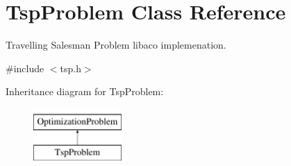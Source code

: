 \hypertarget{classTspProblem}{\section{Tsp\-Problem Class Reference}
\label{classTspProblem}
}


Travelling Salesman Problem libaco implemenation.  




{\ttfamily \#include $<$tsp.\-h$>$}

Inheritance diagram for Tsp\-Problem\-:\begin{figure}[H]
\begin{center}
\leavevmode
\includegraphics[height=2.000000cm]{classTspProblem}
\end{center}
\end{figure}
